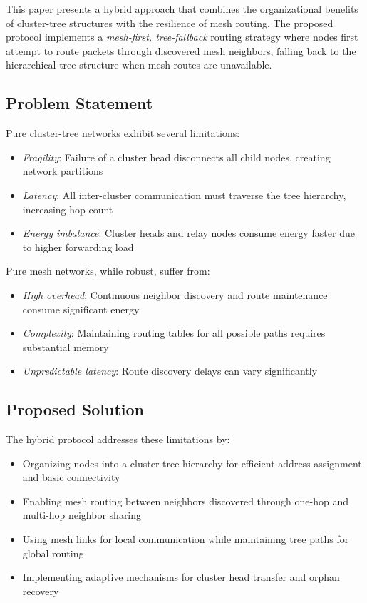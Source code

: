 \documentclass[conference]{IEEEtran}
\begin{document}
This paper presents a hybrid approach that combines the organizational benefits of cluster-tree structures with the resilience of mesh routing. The proposed protocol implements a \emph{mesh-first, tree-fallback} routing strategy where nodes first attempt to route packets through discovered mesh neighbors, falling back to the hierarchical tree structure when mesh routes are unavailable.

\subsection{Problem Statement}
Pure cluster-tree networks exhibit several limitations:
\begin{itemize}
    \item \emph{Fragility}: Failure of a cluster head disconnects all child nodes, creating network partitions
    \item \emph{Latency}: All inter-cluster communication must traverse the tree hierarchy, increasing hop count
    \item \emph{Energy imbalance}: Cluster heads and relay nodes consume energy faster due to higher forwarding load
\end{itemize}

Pure mesh networks, while robust, suffer from:
\begin{itemize}
    \item \emph{High overhead}: Continuous neighbor discovery and route maintenance consume significant energy
    \item \emph{Complexity}: Maintaining routing tables for all possible paths requires substantial memory
    \item \emph{Unpredictable latency}: Route discovery delays can vary significantly
\end{itemize}

\subsection{Proposed Solution}
The hybrid protocol addresses these limitations by:
\begin{itemize}
    \item Organizing nodes into a cluster-tree hierarchy for efficient address assignment and basic connectivity
    \item Enabling mesh routing between neighbors discovered through one-hop and multi-hop neighbor sharing
    \item Using mesh links for local communication while maintaining tree paths for global routing
    \item Implementing adaptive mechanisms for cluster head transfer and orphan recovery
\end{itemize}
\end{document}

